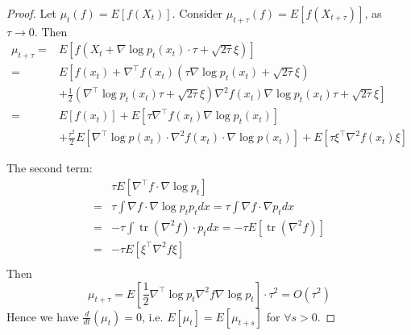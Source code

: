 \documentclass{ctexart}
\newtheorem{proof}{Proof}
\begin{document}
\begin{proof}
    Let  $\mu_{t}(f)=E\left[f\left(X_{t}\right)\right]$. Consider  $\mu_{t+\tau}(f)=E\left[f\left(X_{t+\tau}\right)\right]$, as $\tau \rightarrow 0$. Then  
\begin{equation}
    \begin{aligned}
        \mu_{t+\tau}=&E\left[f\left(X_{t}+\nabla \log p_t\left(x_{t}\right) \cdot \tau+\sqrt{2 \tau} \xi\right)\right]\\
        =&E\left[f\left(x_{t}\right)+\nabla^{\top} f\left(x_{t}\right)\left(\tau \nabla \log p_t\left(x_{t}\right)+\sqrt{2 \tau} \xi\right)\right. \\
        &+\frac{1}{2}\left.\left(\nabla^{\top}\log p_t(x_t)\tau + \sqrt{2\tau}\xi\right)\nabla^2f(x_t)\nabla\log p_t(x_t)\tau + \sqrt{2\tau}\xi\right]\\
        =&E\left[f\left(x_{t}\right)\right]+E\left[\tau \nabla^{\top}f\left(x_{t}\right) \nabla \log p_t\left(x_{t}\right)\right]\\
        &+\frac{\tau^{2}}{2} E\left[\nabla^{\top} \log p\left(x_{t}\right) \cdot \nabla^{2} f\left(x_{t}\right) \cdot \nabla \log p\left(x_{t}\right)\right] +E\left[\tau \xi^{\top} \nabla^{2} f\left(x_{t}\right) \xi\right]
    \end{aligned}
\end{equation}
 
The second term:
\begin{equation}
    \begin{aligned}
        &\tau E\left[\nabla^{\top} f \cdot \nabla \log p_{t}\right] \\
        =&\tau \int \nabla f \cdot \nabla \log p_{t} p_{t} d x=\tau \int \nabla f \cdot \nabla p_{t} d x \\
        =&-\tau \int \operatorname{tr}\left(\nabla^{2} f\right) \cdot p_{t} d x=-\tau E\left[\operatorname{tr}\left(\nabla^{2} f\right)\right]\\
        =&-\tau E\left[\xi^{\top} \nabla^{2} f \xi\right] \\
    \end{aligned}
\end{equation}
Then 
\begin{equation}
    \mu_{t+\tau} =E\left[\frac{1}{2} \nabla^{\top} \log p_{t} \nabla^{2} f \nabla \log p_{t}\right] \cdot \tau^{2}=O\left(\tau^{2}\right)
\end{equation}
Hence we have $\frac{d}{dt}(\mu_t)=0$, i.e. $E[\mu_t]=E[\mu_{t+s}]$ for $\forall s>0$.
\end{proof}
\end{document}
